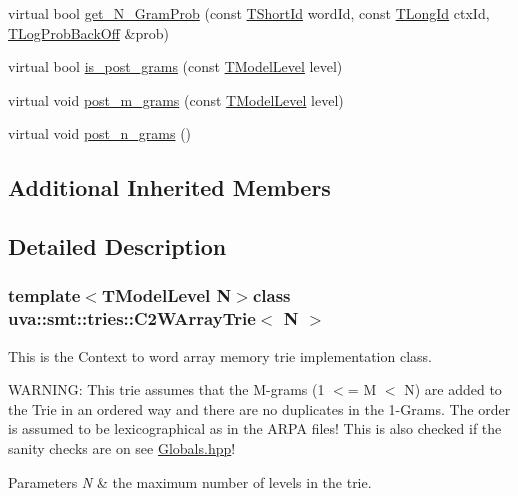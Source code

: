 \begin{DoxyCompactItemize}
\item 
virtual bool \hyperlink{classuva_1_1smt_1_1tries_1_1_c2_w_array_trie_ab6754dddb336ff4361003028ce2ee280}{get\+\_\+\+N\+\_\+\+Gram\+Prob} (const \hyperlink{namespaceuva_1_1smt_1_1hashing_adcf22e1982ad09d3a63494c006267469}{T\+Short\+Id} word\+Id, const \hyperlink{namespaceuva_1_1smt_1_1hashing_a5992ac0dea0fb3226fb403ede09fad55}{T\+Long\+Id} ctx\+Id, \hyperlink{namespaceuva_1_1smt_1_1tries_acd0660255dd9ef5d644f01de49102750}{T\+Log\+Prob\+Back\+Off} \&prob)
\item 
virtual bool \hyperlink{classuva_1_1smt_1_1tries_1_1_c2_w_array_trie_adc09a52f78098d1011fc481f36cf19f9}{is\+\_\+post\+\_\+grams} (const \hyperlink{namespaceuva_1_1smt_1_1tries_a20577a44b3a42d26524250634379b7cb}{T\+Model\+Level} level)
\item 
virtual void \hyperlink{classuva_1_1smt_1_1tries_1_1_c2_w_array_trie_a1a412c43dc00b64041cd4bb8245df1dd}{post\+\_\+m\+\_\+grams} (const \hyperlink{namespaceuva_1_1smt_1_1tries_a20577a44b3a42d26524250634379b7cb}{T\+Model\+Level} level)
\item 
virtual void \hyperlink{classuva_1_1smt_1_1tries_1_1_c2_w_array_trie_a0ceb69ca063fb5cadaf1d5903dd5ffbc}{post\+\_\+n\+\_\+grams} ()
\end{DoxyCompactItemize}
\subsection*{Additional Inherited Members}


\subsection{Detailed Description}
\subsubsection*{template$<$T\+Model\+Level N$>$class uva\+::smt\+::tries\+::\+C2\+W\+Array\+Trie$<$ N $>$}

This is the Context to word array memory trie implementation class.

W\+A\+R\+N\+I\+N\+G\+: This trie assumes that the M-\/grams (1 $<$= M $<$ N) are added to the Trie in an ordered way and there are no duplicates in the 1-\/\+Grams. The order is assumed to be lexicographical as in the A\+R\+P\+A files! This is also checked if the sanity checks are on see \hyperlink{_globals_8hpp}{Globals.\+hpp}!


\begin{DoxyParams}{Parameters}
{\em N} & the maximum number of levels in the trie. \\
\hline
\end{DoxyParams}


